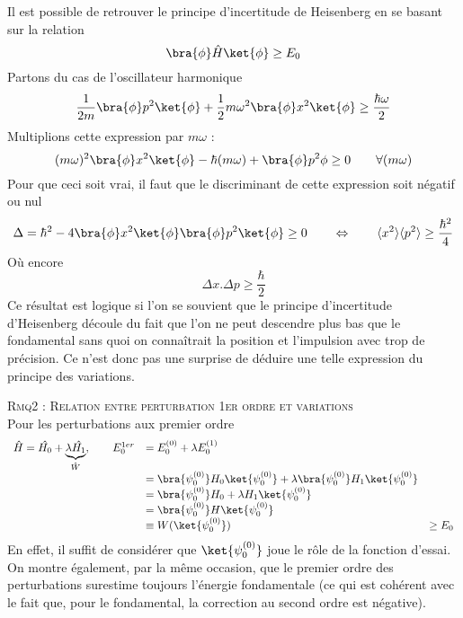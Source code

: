 		Il est possible de retrouver le principe d'incertitude de Heisenberg en se basant sur la relation
		\begin{equation}
		\bra{\phi}\hat{H}\ket{\phi} \geq E_0
		\end{equation}		
		Partons du cas de l'oscillateur harmonique
		\begin{equation}
		\frac{1}{2m}\bra{\phi}p^2\ket{\phi} + \frac{1}{2}m\omega^2\bra{\phi}x^2\ket{\phi} \geq 
		\frac{\hbar\omega}{2}
		\end{equation}
		Multiplions cette expression par $m\omega$ :
		\begin{equation}
		(m\omega)^2\bra{\phi}x^2\ket{\phi} - \hbar(m\omega) + \bra{\phi}p^2{\phi} \geq 0\qquad 
		\forall (m\omega)
		\end{equation}
		Pour que ceci soit vrai, il faut que le discriminant de cette expression soit négatif ou 
		nul 
		\begin{equation}
		\Delta = \hbar^2-4\bra{\phi}x^2\ket{\phi}\bra{\phi}p^2\ket{\phi}\geq 0\qquad\Leftrightarrow
		\qquad \langle x^2\rangle\langle p^2\rangle \geq \frac{\hbar^2}{4}
		\end{equation}
		Où encore
		\begin{equation}
		\Delta x.\Delta p \geq \dfrac{\hbar}{2}
		\end{equation}
		Ce résultat est logique si l'on se souvient que le principe d'incertitude d'Heisenberg 
		découle du fait que l'on ne peut descendre plus bas que le fondamental sans quoi on 
		connaîtrait la position et l'impulsion avec trop de précision. Ce n'est donc pas une 
		surprise de déduire une telle expression du principe des variations.
		
		
		\textsc{Rmq2 : Relation entre perturbation 1er ordre et variations}\\
		Pour les perturbations aux premier ordre
		\begin{equation}
		\begin{array}{lll}
		\hat H = \hat{H_0} + \underbrace{\lambda\hat{H_1}}_{\hat{W}},\qquad E_0^{1er} &= E_0^{(0)}+
		\lambda E_0^{(1)}\\
		&= \bra{\psi_0^{(0)}}H_0\ket{\psi_0^{(0)}} + \lambda\bra{\psi_0^{(0)}}H_1\ket{\psi_0^{(0)}}\\
		&= \bra{\psi_0^{(0)}}H_0+\lambda H_1\ket{\psi_0^{(0)}}\\
		&= \bra{\psi_0^{(0)}}H\ket{\psi_0^{(0)}} \\
		&\equiv W(\ket{\psi_0^{(0)}}) &\geq E_0
		\end{array}
		\end{equation}
		En effet, il suffit de considérer que $\ket{\psi_0^{(0)}}$ joue le rôle de la fonction 
		d'essai. On montre également, par la même occasion, que le premier ordre des perturbations 
		surestime toujours l'énergie fondamentale (ce qui est cohérent avec le fait que, pour le 
		fondamental, la correction au second ordre est négative).
		
